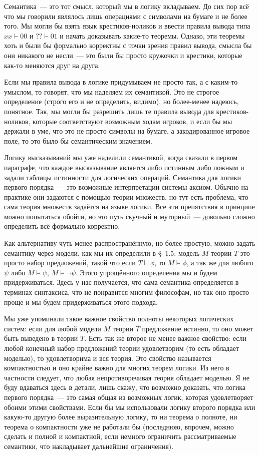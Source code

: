 Семантика~--- это тот смысл, который мы в логику вкладываем. До сих пор всё что мы говорили являлось лишь операциями с символами на бумаге и не более того. Мы могли бы взять язык крестиков-ноликов и ввести правила вывода типа $xx\vdash00$ и $??\vdash01$ и начать доказывать какие-то теоремы. Однако, эти теоремы хоть и были бы формально корректны с точки зрения правил вывода, смысла бы они никакого не несли~--- это были бы просто кружочки и крестики, которые как-то меняются друг на друга. 

Если мы правила вывода в логике придумываем не просто так, а с каким-то умыслом, то говорят, что мы наделяем их семантикой. Это не строгое определение (строго его и не определить, видимо), но более-менее надеюсь, понятное. Так, мы могли бы разрешить лишь те правила вывода для крестиков-ноликов, которые соответствуют возможным ходам игроков, и если бы мы держали в уме, что это не просто символы на бумаге, а закодированное игровое поле, то это было бы семантическим значением.

Логику высказываний мы уже наделили семантикой, когда сказали в первом параграфе, что каждое высказывание является либо истинным либо ложным и задали таблицы истинности для логических операций. Семантика для логики первого порядка~--- это возможные интерпретации системы аксиом. Обычно на практике они задаются с помощью теории множеств, но тут есть проблема, что сама теория множеств задаётся на языке логики. Все эти препятствия в принципе можно попытаться обойти, но это путь скучный и муторный~--- довольно сложно определить всё формально корректно.

Как альтернативу чуть менее распространённую, но более простую, можно задать семантику через модели, как мы их определили в \S~1.5: модель $M$ теории $T$ это просто набор предложений, такой что если $T\vdash\phi$, то $M\models \phi$, а так же для любого $\psi$ либо $M\models \psi$, $M\models \neg\psi$. Этого упрощённого определения мы и будем придерживаться. Здесь у нас получается, что сама семантика определяется в терминах синтаксиса, что не понравится многим философам, но так оно просто проще и мы будем придерживаться этого подхода.

Мы уже упоминали такое важное свойство полноты некоторых логических систем: если для любой модели $M$ теории $T$ предложение истинно, то оно может быть выведено в теории $T$. Есть так же второе не менее важное свойство: если любой конечный набор предложений теории удовлетворим (то есть обладает моделью), то удовлетворима и вся теория. Это свойство называется компактностью и оно крайне важно для многих теорем логики. Из него в частности следует, что любая непротиворечивая теория обладает моделью. Я не буду вдаваться здесь в детали, лишь скажу, что возможно доказать, что логика первого порядка~--- это самая общая из возможных логик, которая удовлетворяет обоими этими свойствами. Если бы мы использовали логику второго порядка или какую-то другую более выразительную логику, то ни теорема о полноте, ни теорема о компактности уже не работали бы (последнюю, впрочем, можно сделать и полной и компактной, если немного ограничить рассматриваемые семантики, что накладывает дальнейшие ограничения).


